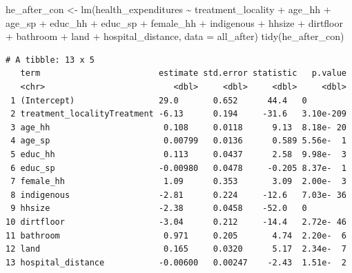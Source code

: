 \documentclass[
  letterpaper,
  DIV=11,
  numbers=noendperiod]{scrartcl}
\newenvironment{Shaded}{\begin{snugshade}}{\end{snugshade}}
\newcommand{\AttributeTok}[1]{\textcolor[rgb]{0.40,0.45,0.13}{#1}}
\newcommand{\FunctionTok}[1]{\textcolor[rgb]{0.28,0.35,0.67}{#1}}
\newcommand{\NormalTok}[1]{\textcolor[rgb]{0.00,0.23,0.31}{#1}}
\newcommand{\OtherTok}[1]{\textcolor[rgb]{0.00,0.23,0.31}{#1}}
\newcommand{\SpecialCharTok}[1]{\textcolor[rgb]{0.37,0.37,0.37}{#1}}
\begin{document}
\begin{Shaded}
\begin{Highlighting}[numbers=left,,]
\NormalTok{he\_after\_con }\OtherTok{\textless{}{-}} \FunctionTok{lm}\NormalTok{(health\_expenditures }\SpecialCharTok{\textasciitilde{}}\NormalTok{ treatment\_locality }\SpecialCharTok{+}\NormalTok{ age\_hh }\SpecialCharTok{+}\NormalTok{ age\_sp }\SpecialCharTok{+} 
\NormalTok{                   educ\_hh }\SpecialCharTok{+}\NormalTok{ educ\_sp }\SpecialCharTok{+}\NormalTok{ female\_hh }\SpecialCharTok{+}\NormalTok{ indigenous }\SpecialCharTok{+}\NormalTok{ hhsize }\SpecialCharTok{+} 
\NormalTok{                   dirtfloor }\SpecialCharTok{+}\NormalTok{ bathroom }\SpecialCharTok{+}\NormalTok{ land }\SpecialCharTok{+}\NormalTok{ hospital\_distance, }
                   \AttributeTok{data =}\NormalTok{ all\_after)}
\FunctionTok{tidy}\NormalTok{(he\_after\_con)}
\end{Highlighting}
\end{Shaded}

\begin{verbatim}
# A tibble: 13 x 5
   term                        estimate std.error statistic   p.value
   <chr>                          <dbl>     <dbl>     <dbl>     <dbl>
 1 (Intercept)                 29.0       0.652      44.4   0        
 2 treatment_localityTreatment -6.13      0.194     -31.6   3.10e-209
 3 age_hh                       0.108     0.0118      9.13  8.18e- 20
 4 age_sp                       0.00799   0.0136      0.589 5.56e-  1
 5 educ_hh                      0.113     0.0437      2.58  9.98e-  3
 6 educ_sp                     -0.00980   0.0478     -0.205 8.37e-  1
 7 female_hh                    1.09      0.353       3.09  2.00e-  3
 8 indigenous                  -2.81      0.224     -12.6   7.03e- 36
 9 hhsize                      -2.38      0.0458    -52.0   0        
10 dirtfloor                   -3.04      0.212     -14.4   2.72e- 46
11 bathroom                     0.971     0.205       4.74  2.20e-  6
12 land                         0.165     0.0320      5.17  2.34e-  7
13 hospital_distance           -0.00600   0.00247    -2.43  1.51e-  2
\end{verbatim}
\end{document}
